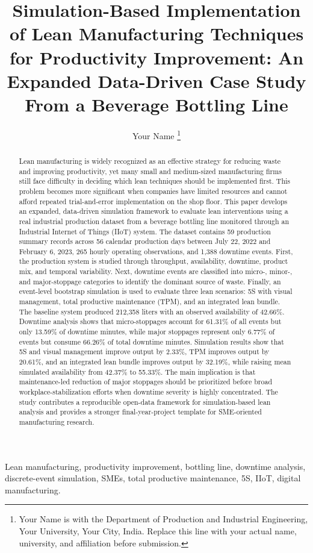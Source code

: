 \documentclass[journal]{IEEEtran}
\title{Simulation-Based Implementation of Lean Manufacturing Techniques for Productivity Improvement: An Expanded Data-Driven Case Study From a Beverage Bottling Line}
\author{
    Your Name
    \thanks{Your Name is with the Department of Production and Industrial Engineering, Your University, Your City, India. Replace this line with your actual name, university, and affiliation before submission.}
}
\begin{document}
\maketitle

\begin{abstract}
Lean manufacturing is widely recognized as an effective strategy for reducing waste and improving productivity, yet many small and medium-sized manufacturing firms still face difficulty in deciding which lean techniques should be implemented first. This problem becomes more significant when companies have limited resources and cannot afford repeated trial-and-error implementation on the shop floor. This paper develops an expanded, data-driven simulation framework to evaluate lean interventions using a real industrial production dataset from a beverage bottling line monitored through an Industrial Internet of Things (IIoT) system. The dataset contains 59 production summary records across 56 calendar production days between July 22, 2022 and February 6, 2023, 265 hourly operating observations, and 1,388 downtime events. First, the production system is studied through throughput, availability, downtime, product mix, and temporal variability. Next, downtime events are classified into micro-, minor-, and major-stoppage categories to identify the dominant source of waste. Finally, an event-level bootstrap simulation is used to evaluate three lean scenarios: 5S with visual management, total productive maintenance (TPM), and an integrated lean bundle. The baseline system produced 212,358 liters with an observed availability of 42.66\%. Downtime analysis shows that micro-stoppages account for 61.31\% of all events but only 13.59\% of downtime minutes, while major stoppages represent only 6.77\% of events but consume 66.26\% of total downtime minutes. Simulation results show that 5S and visual management improve output by 2.33\%, TPM improves output by 20.61\%, and an integrated lean bundle improves output by 32.19\%, while raising mean simulated availability from 42.37\% to 55.33\%. The main implication is that maintenance-led reduction of major stoppages should be prioritized before broad workplace-stabilization efforts when downtime severity is highly concentrated. The study contributes a reproducible open-data framework for simulation-based lean analysis and provides a stronger final-year-project template for SME-oriented manufacturing research.
\end{abstract}

\begin{IEEEkeywords}
Lean manufacturing, productivity improvement, bottling line, downtime analysis, discrete-event simulation, SMEs, total productive maintenance, 5S, IIoT, digital manufacturing.
\end{IEEEkeywords}
\end{document}
